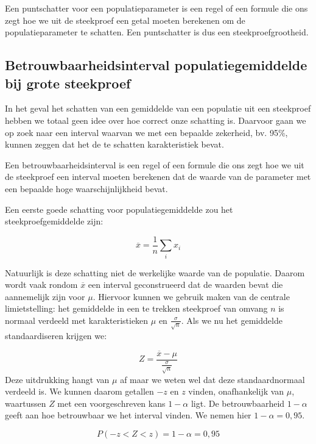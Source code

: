{\begin{definition}[puntschatter]
  Een puntschatter voor een populatieparameter is een regel of een formule die ons zegt hoe we uit de steekproef een getal moeten berekenen om de populatieparameter te schatten. Een puntschatter is dus een steekproefgrootheid.
\end{definition}

\subsection{Betrouwbaarheidsinterval populatiegemiddelde bij grote steekproef}

In het geval het schatten van een gemiddelde van een populatie uit een steekproef hebben we totaal geen idee over hoe correct onze schatting is. Daarvoor gaan we op zoek naar een interval waarvan we met een bepaalde zekerheid, bv. 95\%, kunnen zeggen dat het de te schatten karakteristiek bevat.

\begin{definition}[Betrouwbaarheidsinterval]
Een betrouwbaarheidsinterval is een regel of een formule die ons zegt hoe we uit de steekproef een interval moeten berekenen dat de waarde van de parameter met een bepaalde hoge waarschijnlijkheid bevat.
\end{definition}

Een eerste goede schatting voor populatiegemiddelde zou het steekproefgemiddelde zijn:

\[ \overline{x} = \frac{1}{n} \sum_{i} x_{i} \]

Natuurlijk is deze schatting niet de werkelijke waarde van de populatie. Daarom wordt vaak rondom $\overline{x}$ een interval geconstrueerd dat de waarden bevat die aannemelijk zijn voor $\mu$. Hiervoor kunnen we gebruik maken van de centrale limietstelling: het gemiddelde in een te trekken steekproef van omvang $n$ is normaal verdeeld met karakteristieken $\mu$ en $\frac{\sigma}{\sqrt{n}}$.  Als we nu het gemiddelde standaardiseren krijgen we:

\[ Z = \frac{\overline{x} - \mu}{\frac{\sigma}{\sqrt{n}}} \]
 Deze uitdrukking hangt van $\mu$ af maar we weten wel dat deze standaardnormaal verdeeld is. We kunnen daarom getallen $-z$ en $z$ vinden, onafhankelijk van $\mu$, waartussen $Z$ met een voorgeschreven kans $1 - \alpha$ ligt. De betrouwbaarheid $1 - \alpha$ geeft aan hoe betrouwbaar we het interval vinden. We nemen hier $1 - \alpha= 0,95$.

\[P(-z < Z < z) = 1 - \alpha = 0,95 \]

}
